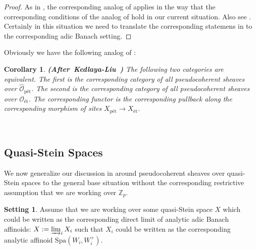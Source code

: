 \documentclass[12pt]{amsart}
\newtheorem{corollary}[theorem]{Corollary}
\theoremstyle{definition}
\numberwithin{equation}{section}
\newtheorem{setting}[theorem]{Setting}
\begin{document}
\begin{proof}
As in \cite[Theorem 3.4.8]{KL2}, the corresponding analog of \cite[Proposition 9.2.6]{KL1} applies in the way that the corresponding conditions of the analog of \cite[Proposition 9.2.6]{KL1} hold in our current situation. Also see \cite[Theorem 2.9.9, Remark 2.9.10 and Lemma 1.10.4]{Ked1}. Certainly in this situation we need to translate the corresponding statemens in \cite[Theorem 2.9.9, Remark 2.9.10 and Lemma 1.10.4]{Ked1} to the corresponding adic Banach setting.	
\end{proof}




\indent Obviously we have the following analog of \cite[Corollary 3.4.9]{KL2}:


\begin{corollary} \mbox{\bf{(After Kedlaya-Liu \cite[Corollary 3.4.9]{KL2})}}
The following two categories are equivalent. The first is the corresponding category of all pseudocoherent sheaves over $\widehat{\mathcal{O}}_\text{p\'et}$. The second is the corresponding category of all pseudocoherent sheaves over ${\mathcal{O}}_\text{\'et}$. The corresponding functor is the corresponding pullback along the corresponding morphism of sites $X_{\text{p\'et}}\rightarrow X_{\text{\'et}}$. 	
\end{corollary}






\
\subsection{Quasi-Stein Spaces}

We now generalize our discussion in \cite{TX2} around pseudocoherent sheaves over quasi-Stein spaces to the general base situation without the corresponding restrictive assumption that we are working over $\mathbb{Z}_p$.



\begin{setting}
Assume that we are working over some quasi-Stein space $X$ which could be written as the corresponding direct limit of analytic adic Banach affinoids: $X:=\varinjlim_i  X_i$ such that $X_i$ could be written as the corresponding analytic affinoid $\mathrm{Spa}(W_i,W_i^+)$.	
\end{setting}


\end{document}
